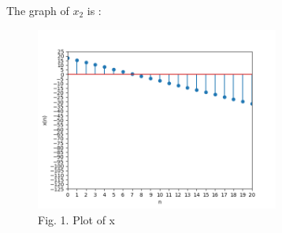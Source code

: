 \documentclass[journal,12pt,twocolumn]{IEEEtran}
\theoremstyle{remark}
\begin{document}
\large\textbf{} \normalsize The graph of $x_{2}$ is :
\begin{figure}[!ht]
    \begin{center}
    \includegraphics[width = 8cm]{Figure_2}\\
    Fig. 1. Plot of x \\
    \end{center}
\end{figure}
\end{document}
